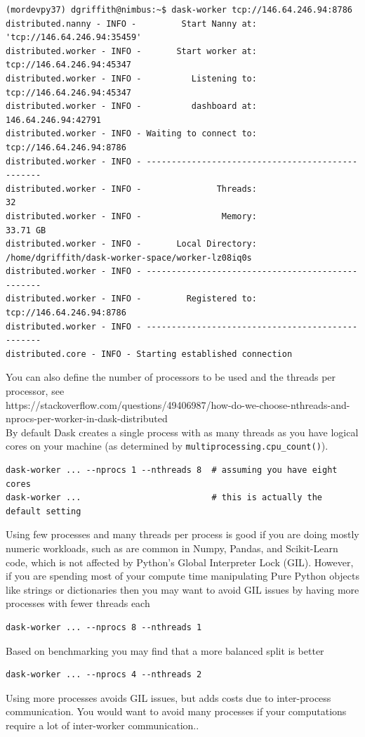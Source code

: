 \begin{enumerate}
\begin{lstlisting}[style=tinysize]
(mordevpy37) dgriffith@nimbus:~$ dask-worker tcp://146.64.246.94:8786
distributed.nanny - INFO -         Start Nanny at: 'tcp://146.64.246.94:35459'
distributed.worker - INFO -       Start worker at:  tcp://146.64.246.94:45347
distributed.worker - INFO -          Listening to:  tcp://146.64.246.94:45347
distributed.worker - INFO -          dashboard at:        146.64.246.94:42791
distributed.worker - INFO - Waiting to connect to:   tcp://146.64.246.94:8786
distributed.worker - INFO - -------------------------------------------------
distributed.worker - INFO -               Threads:                         32
distributed.worker - INFO -                Memory:                   33.71 GB
distributed.worker - INFO -       Local Directory: /home/dgriffith/dask-worker-space/worker-lz08iq0s
distributed.worker - INFO - -------------------------------------------------
distributed.worker - INFO -         Registered to:   tcp://146.64.246.94:8786
distributed.worker - INFO - -------------------------------------------------
distributed.core - INFO - Starting established connection
\end{lstlisting}

You can also define the number of processors to be used and the threads per processor, see \\ https://stackoverflow.com/questions/49406987/how-do-we-choose-nthreads-and-nprocs-per-worker-in-dask-distributed\\

By default Dask creates a single process with as many threads as you have logical cores on your machine (as determined by \lstinline{multiprocessing.cpu_count()}).
\begin{lstlisting}
dask-worker ... --nprocs 1 --nthreads 8  # assuming you have eight cores
dask-worker ...                          # this is actually the default setting
\end{lstlisting}
Using few processes and many threads per process is good if you are doing mostly numeric workloads, such as are common in Numpy, Pandas, and Scikit-Learn code, which is not affected by Python's Global Interpreter Lock (GIL).
However, if you are spending most of your compute time manipulating Pure Python objects like strings or dictionaries then you may want to avoid GIL issues by having more processes with fewer threads each
\begin{lstlisting}
dask-worker ... --nprocs 8 --nthreads 1
\end{lstlisting}
Based on benchmarking you may find that a more balanced split is better
\begin{lstlisting}
dask-worker ... --nprocs 4 --nthreads 2
\end{lstlisting}
Using more processes avoids GIL issues, but adds costs due to inter-process communication. You would want to avoid many processes if your computations require a lot of inter-worker communication..


\end{enumerate}
